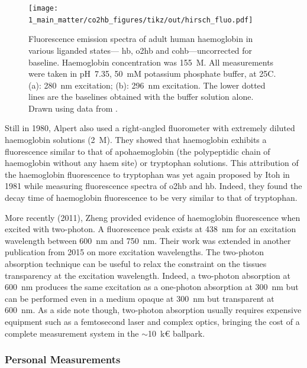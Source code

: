 \begin{figure}
	\centering
	\texttt{[image: 1\_main\_matter/co2hb\_figures/tikz/out/hirsch\_fluo.pdf]}
	\caption[Fluorescence emission spectra of adult human haemoglobin in various liganded states.]{Fluorescence emission spectra of adult human haemoglobin in various liganded states---\ie{} \gls{hb}, \gls{o2hb} and \gls{cohb}---uncorrected for baseline. Haemoglobin concentration was 155~\textmu{}M. All measurements were taken in pH~7.35, 50~mM potassium phosphate buffer, at 25{\degree}C. (a): 280~nm excitation; (b): 296~nm excitation. The lower dotted lines are the baselines obtained with the buffer solution alone. Drawn using data from \cite{hirsch1981}.}
	\label{fig:co2hb:hirsch1981_fluo}
\end{figure}

Still in 1980, Alpert \etal{} also used a right-angled fluorometer with extremely diluted haemoglobin solutions (2~\textmu{}M)\cite{alpert1980}. They showed that haemoglobin exhibits a fluorescence similar to that of apohaemoglobin (the polypeptidic chain of haemoglobin without any haem site) or tryptophan solutions. This attribution of the haemoglobin fluorescence to tryptophan was yet again proposed by Itoh \etal{} in 1981\cite{itoh1981} while measuring fluorescence spectra of \gls{o2hb} and \gls{hb}. Indeed, they found the decay time of haemoglobin fluorescence to be very similar to that of tryptophan.

More recently (2011), Zheng \etal{}\cite{zheng2011} provided evidence of haemoglobin fluorescence when excited with two-photon. A fluorescence peak exists at 438~nm for an excitation wavelength between 600~nm and 750~nm. Their work was extended in another publication from 2015\cite{sun2015} on more excitation wavelengths. The two-photon absorption technique can be useful to relax the constraint on the tissues transparency at the excitation wavelength. Indeed, a two-photon absorption at 600~nm produces the same excitation as a one-photon absorption at 300~nm but can be performed even in a medium opaque at 300~nm but transparent at 600~nm. As a side note though, two-photon absorption usually requires expensive equipment such as a femtosecond laser and complex optics, bringing the cost of a complete measurement system in the $\sim$10~k{\euro} ballpark\cite{sakadzic2008, perillo2016}.

\subsubsection{Personal Measurements}


